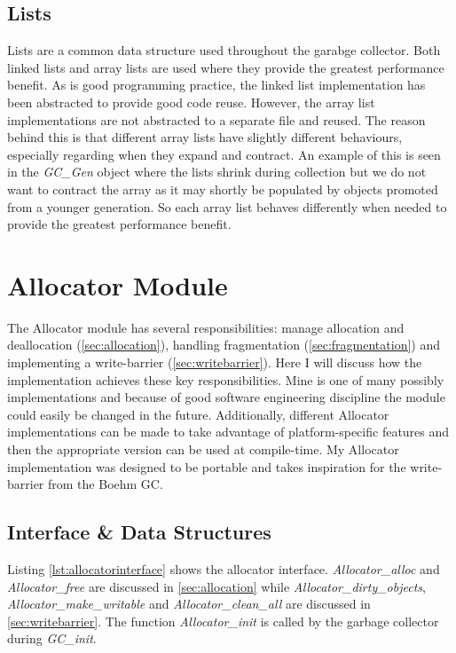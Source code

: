 \documentclass[../diss.tex]{subfiles}
\begin{document}
\subsection{Lists}
Lists are a common data structure used throughout the garabge collector. Both linked lists and array lists are used where they provide the greatest performance benefit. As is good programming practice, the linked list implementation has been abstracted to provide good code reuse. However, the array list implementations are not abstracted to a separate file and reused. The reason behind this is that different array lists have slightly different behaviours, especially regarding when they expand and contract. An example of this is seen in the \emph{GC\_Gen} object where the lists shrink during collection but we do not want to contract the array as it may shortly be populated by objects promoted from a younger generation. So each array list behaves differently when needed to provide the greatest performance benefit.

\section{Allocator Module} \label{sec:allocator}

The Allocator module has several responsibilities: manage allocation and deallocation (\cref{sec:allocation}), handling fragmentation (\cref{sec:fragmentation}) and implementing a write-barrier (\cref{sec:writebarrier}). Here I will discuss how the implementation achieves these key responsibilities. Mine is one of many possibly implementations and because of good software engineering discipline the module could easily be changed in the future. Additionally, different Allocator implementations can be made to take advantage of platform-specific features and then the appropriate version can be used at compile-time. My Allocator implementation was designed to be portable and takes inspiration for the write-barrier from the Boehm GC.

\subsection{Interface \& Data Structures} \label{sec:allocatorinterface}

Listing \ref{lst:allocatorinterface} shows the allocator interface. \emph{Allocator\_alloc} and \emph{Allocator\_free} are discussed in \cref{sec:allocation} while \emph{Allocator\_dirty\_objects}, \emph{Allocator\_make\_writable} and \emph{Allocator\_clean\_all} are discussed in \cref{sec:writebarrier}. The function \emph{Allocator\_init} is called by the garbage collector during \emph{GC\_init}.
\end{document}
